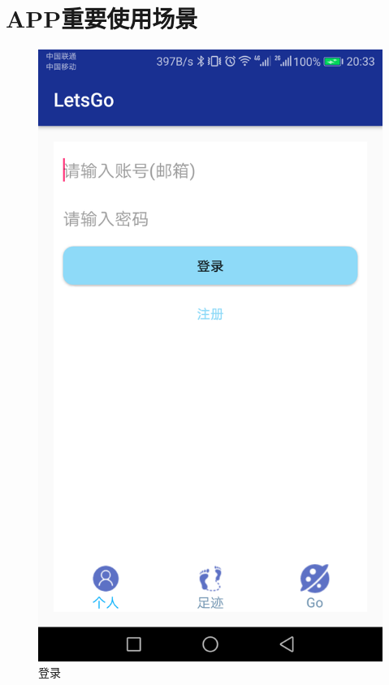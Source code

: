 \documentclass[UTF8]{article}
\begin{document}
\section{APP重要使用场景}
\begin{figure}[H]
\begin{minipage}[t]{0.33\textwidth}
    \includegraphics[width=\textwidth]{images/demo_login.png}
    \caption{登录}
\end{minipage}
\begin{minipage}[t]{0.33\textwidth}

\end{minipage}
\end{figure}
\end{document}
